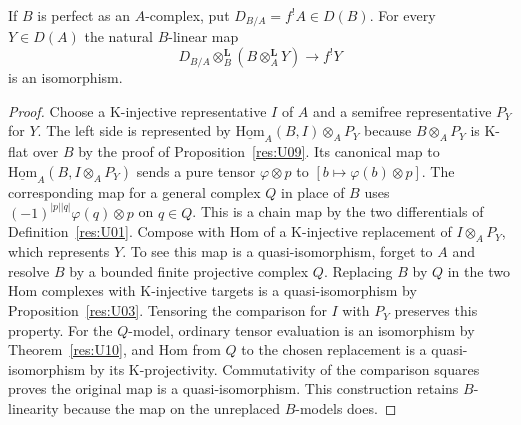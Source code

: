 \begin{proposition}\label{res:U15}
If \(B\) is perfect as an \(A\)-complex, put
\(D_{B/A}=f^! A\in D(B)\).
For every \(Y\in D(A)\) the natural \(B\)-linear map
\[
 D_{B/A}\otimes_B^{\mathbf L}(B\otimes_A^{\mathbf L}Y)
     \longrightarrow f^!Y
\]
is an isomorphism.
\end{proposition}
\begin{proof}
Choose a K-injective representative \(I\) of \(A\) and a
semifree representative \(P_Y\) for \(Y\).
The left side is represented by
\(\underline{\mathrm{Hom}}_A(B,I)\otimes_A P_Y\)
because \(B\otimes_A P_Y\) is K-flat over \(B\) by the proof
of Proposition~\ref{res:U09}. Its canonical map to
\(\underline{\mathrm{Hom}}_A(B,I\otimes_A P_Y)\)
sends a pure tensor \(\varphi\otimes p\) to
\([b\mapsto\varphi(b)\otimes p]\).
The corresponding map for a general complex \(Q\) in place of
\(B\) uses \((-1)^{|p||q|}\varphi(q)\otimes p\) on \(q\in Q\).
This is a chain map by the two differentials of
Definition~\ref{res:U01}. Compose with Hom of a
K-injective replacement of \(I\otimes_A P_Y\), which represents
\(Y\). To see this map is a quasi-isomorphism, forget to
\(A\) and resolve \(B\) by a bounded finite projective complex
\(Q\). Replacing \(B\) by \(Q\) in the two Hom complexes with
K-injective targets is a quasi-isomorphism by
Proposition~\ref{res:U03}. Tensoring the comparison for \(I\)
with \(P_Y\) preserves this property. For the \(Q\)-model,
ordinary tensor evaluation is an isomorphism by
Theorem~\ref{res:U10}, and Hom from \(Q\) to the chosen
replacement is a quasi-isomorphism by its K-projectivity.
Commutativity of the comparison squares proves the original map
is a quasi-isomorphism. This construction retains \(B\)-linearity
because the map on the unreplaced \(B\)-models does.
\end{proof}

